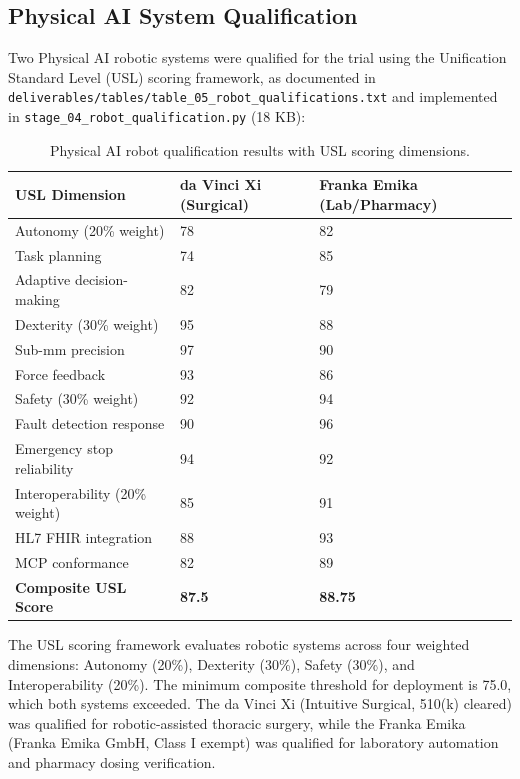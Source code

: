 \subsection{Physical AI System Qualification}

Two Physical AI robotic systems were qualified for the trial using the Unification Standard Level (USL) scoring framework, as documented in \texttt{deliverables/tables/table\_05\_robot\_qualifications.txt} and implemented in \texttt{stage\_04\_robot\_qualification.py} (18 KB):

\begin{table}[H]
\centering
\caption{Physical AI robot qualification results with USL scoring dimensions.}
\label{tab:robot-qual}
\small
\begin{tabularx}{\textwidth}{@{}L{4cm}C{3cm}C{3cm}@{}}
\toprule
\textbf{USL Dimension} & \textbf{da Vinci Xi (Surgical)} & \textbf{Franka Emika (Lab/Pharmacy)} \\
\midrule
Autonomy (20\% weight) & 78 & 82 \\
\hspace{0.3cm}Task planning & 74 & 85 \\
\hspace{0.3cm}Adaptive decision-making & 82 & 79 \\
Dexterity (30\% weight) & 95 & 88 \\
\hspace{0.3cm}Sub-mm precision & 97 & 90 \\
\hspace{0.3cm}Force feedback & 93 & 86 \\
Safety (30\% weight) & 92 & 94 \\
\hspace{0.3cm}Fault detection response & 90 & 96 \\
\hspace{0.3cm}Emergency stop reliability & 94 & 92 \\
Interoperability (20\% weight) & 85 & 91 \\
\hspace{0.3cm}HL7 FHIR integration & 88 & 93 \\
\hspace{0.3cm}MCP conformance & 82 & 89 \\
\midrule
\textbf{Composite USL Score} & \textbf{87.5} & \textbf{88.75} \\
\bottomrule
\end{tabularx}
\end{table}

The USL scoring framework evaluates robotic systems across four weighted dimensions: Autonomy (20\%), Dexterity (30\%), Safety (30\%), and Interoperability (20\%). The minimum composite threshold for deployment is 75.0, which both systems exceeded. The da Vinci Xi (Intuitive Surgical, 510(k) cleared) was qualified for robotic-assisted thoracic surgery, while the Franka Emika (Franka Emika GmbH, Class I exempt) was qualified for laboratory automation and pharmacy dosing verification.

